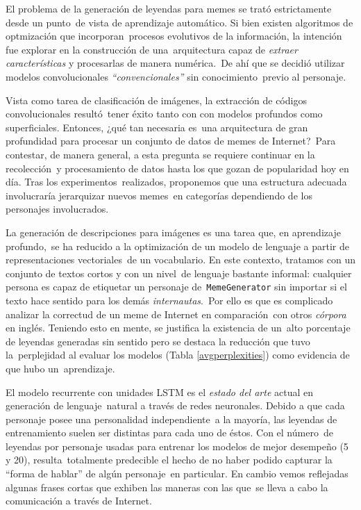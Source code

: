 \noindent
El problema de la generación de leyendas para memes se trató estrictamente desde un punto\
de vista de aprendizaje automático. Si bien existen algoritmos de optmización que incorporan\
procesos evolutivos de la información, la intención fue explorar en la construcción de una\
arquitectura capaz de \emph{extraer características} y procesarlas de manera numérica.\
De ahí que se decidió utilizar modelos convolucionales \emph{``convencionales''} sin conocimiento\
previo al personaje.\par
Vista como tarea de clasificación de imágenes, la extracción de códigos convolucionales resultó\
tener éxito tanto con con modelos profundos como superficiales. Entonces, ¿qué tan necesaria es\
una arquitectura de gran profundidad para procesar un conjunto de datos de memes de Internet?\
Para contestar, de manera general, a esta pregunta se requiere continuar en la recolección\
y procesamiento de datos hasta los que gozan de popularidad hoy en día. Tras los experimentos\
realizados, proponemos que una estructura adecuada involucraría jerarquizar nuevos memes\
en categorías dependiendo de los personajes involucrados.\par
La generación de descripciones para imágenes es una tarea que, en aprendizaje profundo,\
se ha reducido a la optimización de un modelo de lenguaje a partir de representaciones vectoriales\
de un vocabulario. En este contexto, tratamos con un conjunto de textos cortos y con un nivel\
de lenguaje bastante informal: cualquier persona es capaz de etiquetar un personaje de\
\verb+MemeGenerator+ sin importar si el texto hace sentido para los demás \emph{internautas}.\
Por ello es que es complicado analizar la correctud de un meme de Internet en comparación\
con otros \emph{córpora} en inglés. Teniendo esto en mente, se justifica la existencia de un\
alto porcentaje de leyendas generadas sin sentido pero se destaca la reducción que tuvo la\
perplejidad al evaluar los modelos (Tabla \ref{avgperplexities}) como evidencia de que hubo un\
aprendizaje.\par
El modelo recurrente con unidades LSTM es el \emph{estado del arte} actual en generación de lenguaje\
natural a través de redes neuronales. Debido a que cada personaje posee una personalidad independiente\
a la mayoría, las leyendas de entrenamiento suelen ser distintas para cada uno de éstos. Con el número\
de leyendas por personaje usadas para entrenar los modelos de mejor desempeño (5 y 20), resulta\
totalmente predecible el hecho de no haber podido capturar la ``forma de hablar'' de algún personaje\
en particular. En cambio vemos reflejadas algunas frases cortas que exhiben las maneras con las que\
se lleva a cabo la comunicación a través de Internet.

